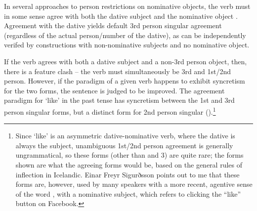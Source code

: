 \documentclass[output=paper]{langscibook}
\begin{document}
\ea \label{woodboree}
    \z
\z
In several approaches to person restrictions on nominative objects, the verb must in some sense agree with both the dative subject and the nominative object  \citep{Boeckx:2000kf,Schutze:2003mh,Koopman:2006zp,SigurTHsson:2008dm,Ussery:2009jd}. Agreement with the dative yields default 3rd person singular agreement (regardless of the actual person/number of the dative), as can be independently verifed by constructions with non-nominative subjects and no nominative object. 

\ea 
    \z
\z
If the verb agrees with both a dative subject and a non-3rd person object, then, there is a feature clash -- the verb must simultaneously be 3rd and 1st/2nd person. However, if the paradigm of a given verb happens to exhibit syncretism for the two forms, the sentence is judged to be improved. The agreement paradigm for  `like' in the past tense has syncretism between the 1st and 3rd person singular forms, but a distinct form for 2nd person singular ().\footnote{Since  `like' is an asymmetric dative-nominative verb, where the dative is always the subject, unambiguous 1st/2nd person agreement is generally ungrammatical, so these forms (other than   and 3)  are quite rare; the forms shown are what the agreeing forms would be, based on the general rules of inflection in Icelandic. Einar Freyr Sigurðsson points out to me that these forms are, however, used by many speakers with a more recent, agentive sense of the word , with a nominative subject, which refers to clicking the “like” button on Facebook.} 
\end{document}
